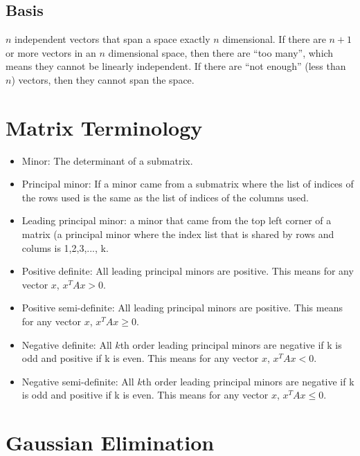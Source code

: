 \documentclass[12pt]{article}
\begin{document}
\subsection{Basis}
$n$ independent vectors that span a space exactly $n$ dimensional.  If there are $n+1$ or more vectors in an $n$ dimensional space, then there are ``too many'', which means they cannot be linearly independent. If there are ``not enough'' (less than $n$) vectors, then they cannot span the space.




\section{Matrix Terminology}
\begin{itemize}
\item Minor: The determinant of a submatrix.

\item Principal minor: If a minor came from a submatrix where the list of indices of the rows used is the same as the list of indices of the columns used.

\item Leading principal minor: a minor that came from the top left corner of a matrix (a principal minor where the index list that is shared by rows and colums is {1,2,3,..., k}.

\item Positive definite: All leading principal minors are positive. This means for any vector $x$, $x^T A x > 0$.

\item Positive semi-definite: All leading principal minors are positive. This means for any vector $x$, $x^T A x \geq 0$.

\item Negative definite: All $k$th order leading principal minors are negative if k is odd and positive if k is even. This means for any vector $x$, $x^T A x < 0$.

\item Negative semi-definite: All $k$th order leading principal minors are negative if k is odd and positive if k is even. This means for any vector $x$, $x^T A x \leq 0$.

\end{itemize}

\section{Gaussian Elimination}
\end{document}
